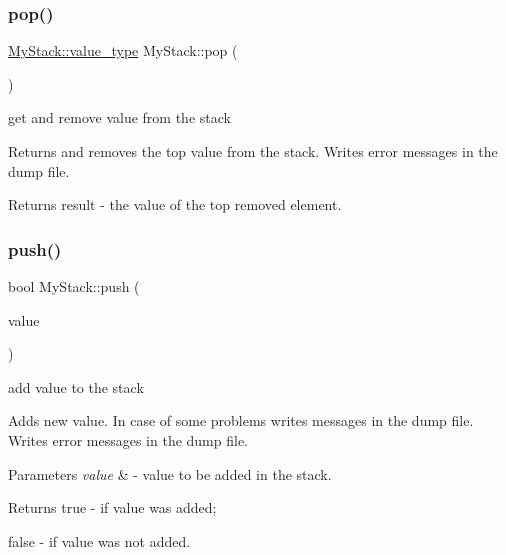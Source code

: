 \subsubsection{\texorpdfstring{pop()}{pop()}}
{\footnotesize\ttfamily \hyperlink{class_my_stack_aef491ce2544b335e96d24a39ad23bc7c}{My\+Stack\+::value\+\_\+type} My\+Stack\+::pop (\begin{DoxyParamCaption}{ }\end{DoxyParamCaption})}



get and remove value from the stack 

Returns and removes the top value from the stack. Writes error messages in the dump file.

\begin{DoxyReturn}{Returns}
{\ttfamily result} -\/ the value of the top removed element. 
\end{DoxyReturn}
\mbox{\label{class_my_stack_ad2908ca3de1e2496ddf3c38b39e44ba5}} 
\subsubsection{\texorpdfstring{push()}{push()}}
{\footnotesize\ttfamily bool My\+Stack\+::push (\begin{DoxyParamCaption}\item[{const \hyperlink{class_my_stack_aef491ce2544b335e96d24a39ad23bc7c}{value\+\_\+type} \&}]{value }\end{DoxyParamCaption})}



add value to the stack 

Adds new value. In case of some problems writes messages in the dump file. Writes error messages in the dump file.


\begin{DoxyParams}{Parameters}
{\em value} & -\/ value to be added in the stack.\\
\hline
\end{DoxyParams}
\begin{DoxyReturn}{Returns}
{\ttfamily true} -\/ if value was added; 

{\ttfamily false} -\/ if value was not added. 
\end{DoxyReturn}
\mbox{\label{class_my_stack_a18fae44197902a8f44f01cc394d15ccd}} 
